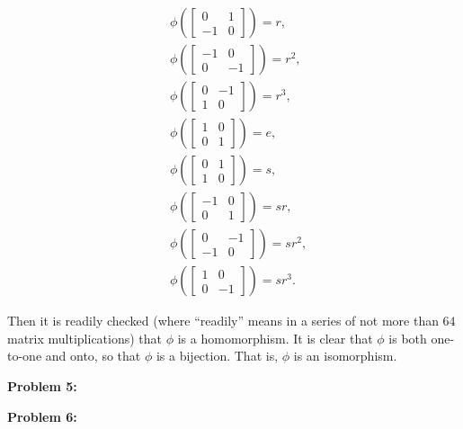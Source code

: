 \documentclass[a4paper,12pt]{article}
\newcommand{\shunt}{\vspace{20mm}}
\begin{document}
\begin{align*}
&\phi(\left[\begin{smallmatrix}0&1\\ -1&0 \end{smallmatrix}\right]) = r,\\
&\phi(\left[\begin{smallmatrix}-1&0\\ 0&-1 \end{smallmatrix}\right]) = r^2,\\
&\phi(\left[\begin{smallmatrix}0&-1\\ 1&0 \end{smallmatrix}\right]) = r^3,\\
&\phi(\left[\begin{smallmatrix}1&0\\ 0&1 \end{smallmatrix}\right]) = e,\\
&\phi(\left[\begin{smallmatrix}0&1\\ 1&0 \end{smallmatrix}\right]) = s,\\
&\phi(\left[\begin{smallmatrix}-1&0\\ 0&1 \end{smallmatrix}\right]) = sr,\\
&\phi(\left[\begin{smallmatrix}0&-1\\ -1&0 \end{smallmatrix}\right]) = sr^2,\\
&\phi(\left[\begin{smallmatrix}1&0\\ 0&-1 \end{smallmatrix}\right]) = sr^3.
\end{align*}

Then it is readily checked (where ``readily'' means in a series of not more than $64$ matrix multiplications) that $\phi$ is a homomorphism. It is clear that $\phi$ is both one-to-one and onto, so that $\phi$ is a bijection. That is, $\phi$ is an isomorphism.

\shunt

{\bf Problem 5:}

\shunt

{\bf Problem 6:}

\shunt
\end{document}
